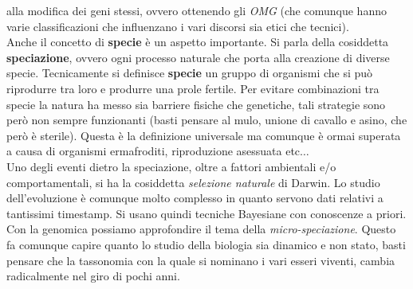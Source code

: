 \documentclass[a4paper,12pt, oneside]{book}
\begin{document}
alla modifica dei geni stessi, ovvero ottenendo gli \textit{OMG} (che comunque
hanno varie classificazioni che influenzano i vari discorsi sia etici che
tecnici). \\
Anche il concetto di \textbf{specie} è un aspetto importante. Si parla della
cosiddetta \textbf{speciazione}, ovvero ogni processo naturale che porta alla
creazione di diverse specie.
Tecnicamente si definisce \textbf{specie} un gruppo di organismi che si può
riprodurre tra loro e produrre una prole fertile. Per evitare combinazioni tra
specie la natura ha messo sia barriere fisiche che genetiche, tali strategie
sono però non sempre funzionanti (basti pensare al mulo, unione di cavallo e
asino, che però è sterile). Questa è la definizione
universale ma comunque è ormai superata a causa di organismi ermafroditi,
riproduzione asessuata etc$\ldots$ \\
Uno degli eventi dietro la speciazione, oltre a fattori ambientali e/o
comportamentali, si ha la cosiddetta \textit{selezione naturale} di Darwin. Lo
studio dell'evoluzione è comunque molto complesso in quanto servono dati
relativi a tantissimi timestamp. Si usano quindi tecniche Bayesiane con
conoscenze a priori. Con la genomica possiamo approfondire il tema della
\textit{micro-speciazione}. Questo fa comunque capire quanto lo studio della
biologia sia dinamico e non stato, basti pensare che la tassonomia con la quale
si nominano i vari esseri viventi, cambia radicalmente nel giro di pochi anni.
\end{document}

